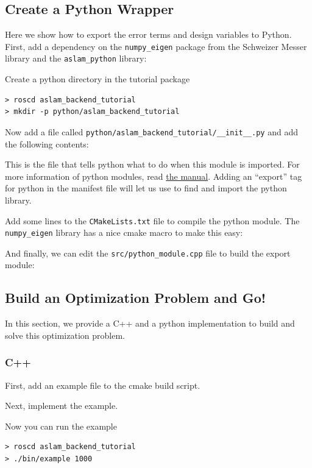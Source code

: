 \documentclass[11pt,a4,oneside]{article}
\newcommand{\txt}[1]{{\footnotesize\texttt{#1}}}
\newcommand{\rospack}[1]{\href{http://www.ros.org/wiki/#1}{{\rosfont{#1}}}}
\newcommand{\listcpp}[2]{}
\newcommand{\listcpprange}[4]{}
\newcommand{\listxmlrange}[4]{}
\begin{document}
\subsection{Create a Python Wrapper}
Here we show how to export the error terms and design variables to Python. First, add a dependency on the \txt{numpy\_eigen} package from the Schweizer Messer library and the \txt{aslam\_python} library:
\listxmlrange{package.xml}{../../aslam_backend_tutorial/package.xml}{14}{16}
Create a python directory in the tutorial package
\begin{lstlisting}
> roscd aslam_backend_tutorial
> mkdir -p python/aslam_backend_tutorial
\end{lstlisting}
Now add a file called \txt{python/aslam\_backend\_tutorial/\_\_init\_\_.py} and add the following contents:
\listcpp{python/aslam\_backend\_tutorial/\_\_init\_\_.py}{../../aslam_backend_tutorial/python/aslam_backend_tutorial/__init__.py}
This is the file that tells python what to do when this module is imported. For more information of python modules, read \href{http://docs.python.org/tutorial/modules.html}{the manual}.
Adding an ``export'' tag for python in the manifest file will let us use \rospack{roslib} to find and import the python library.
\listxmlrange{package.xml}{../../aslam_backend_tutorial/package.xml}{17}{21}
Add some lines to the \txt{CMakeLists.txt} file to compile the python module. The \txt{numpy\_eigen} library has a nice cmake macro to make this easy:
\listcpprange{CMakeLists.txt}{../../aslam_backend_tutorial/CMakeLists.txt}{40}{49}
And finally, we can edit the \txt{src/python\_module.cpp} file to build the export module:
\listcpp{src/python\_module.cpp}{../../aslam_backend_tutorial/src/python_module.cpp}
\subsection{Build an Optimization Problem and Go!}
In this section, we provide a C++ and a python implementation to build and solve this optimization problem.
\subsubsection{C++}
First, add an example file to the cmake build script.
\listcpprange{CMakeLists.txt}{../../aslam_backend_tutorial/CMakeLists.txt}{52}{59}
Next, implement the example.
\listcpp{src/example.cpp}{../../aslam_backend_tutorial/src/example.cpp}
Now you can run the example
\begin{lstlisting}
> roscd aslam_backend_tutorial
> ./bin/example 1000
\end{lstlisting}
\end{document}
